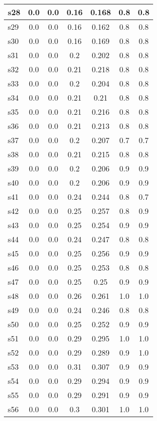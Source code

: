 \documentclass{article}
\begin{document}
\begin{tabular}{|l|c|c|c|c|c|c|}
\hline
s28 &0.0 & 0.0 & 0.16 & 0.168 & 0.8 & 0.8\\
\hline
s29 &0.0 & 0.0 & 0.16 & 0.162 & 0.8 & 0.8\\
\hline
s30 &0.0 & 0.0 & 0.16 & 0.169 & 0.8 & 0.8\\
\hline
s31 &0.0 & 0.0 & 0.2 & 0.202 & 0.8 & 0.8\\
\hline
s32 &0.0 & 0.0 & 0.21 & 0.218 & 0.8 & 0.8\\
\hline
s33 &0.0 & 0.0 & 0.2 & 0.204 & 0.8 & 0.8\\
\hline
s34 &0.0 & 0.0 & 0.21 & 0.21 & 0.8 & 0.8\\
\hline
s35 &0.0 & 0.0 & 0.21 & 0.216 & 0.8 & 0.8\\
\hline
s36 &0.0 & 0.0 & 0.21 & 0.213 & 0.8 & 0.8\\
\hline
s37 &0.0 & 0.0 & 0.2 & 0.207 & 0.7 & 0.7\\
\hline
s38 &0.0 & 0.0 & 0.21 & 0.215 & 0.8 & 0.8\\
\hline
s39 &0.0 & 0.0 & 0.2 & 0.206 & 0.9 & 0.9\\
\hline
s40 &0.0 & 0.0 & 0.2 & 0.206 & 0.9 & 0.9\\
\hline
s41 &0.0 & 0.0 & 0.24 & 0.244 & 0.8 & 0.7\\
\hline
s42 &0.0 & 0.0 & 0.25 & 0.257 & 0.8 & 0.9\\
\hline
s43 &0.0 & 0.0 & 0.25 & 0.254 & 0.9 & 0.9\\
\hline
s44 &0.0 & 0.0 & 0.24 & 0.247 & 0.8 & 0.8\\
\hline
s45 &0.0 & 0.0 & 0.25 & 0.256 & 0.9 & 0.9\\
\hline
s46 &0.0 & 0.0 & 0.25 & 0.253 & 0.8 & 0.8\\
\hline
s47 &0.0 & 0.0 & 0.25 & 0.25 & 0.9 & 0.9\\
\hline
s48 &0.0 & 0.0 & 0.26 & 0.261 & 1.0 & 1.0\\
\hline
s49 &0.0 & 0.0 & 0.24 & 0.246 & 0.8 & 0.8\\
\hline
s50 &0.0 & 0.0 & 0.25 & 0.252 & 0.9 & 0.9\\
\hline
s51 &0.0 & 0.0 & 0.29 & 0.295 & 1.0 & 1.0\\
\hline
s52 &0.0 & 0.0 & 0.29 & 0.289 & 0.9 & 1.0\\
\hline
s53 &0.0 & 0.0 & 0.31 & 0.307 & 0.9 & 0.9\\
\hline
s54 &0.0 & 0.0 & 0.29 & 0.294 & 0.9 & 0.9\\
\hline
s55 &0.0 & 0.0 & 0.29 & 0.291 & 0.9 & 0.9\\
\hline
s56 &0.0 & 0.0 & 0.3 & 0.301 & 1.0 & 1.0\\

\end{tabular}
\end{document}

